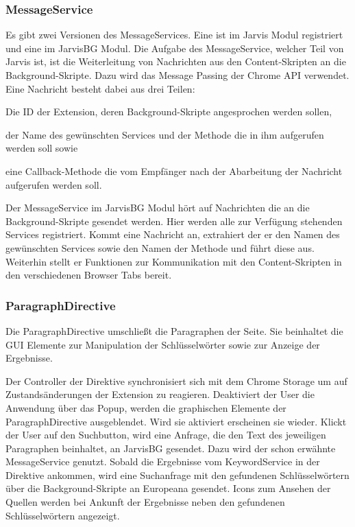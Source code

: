   \subsubsection{MessageService}
  Es gibt zwei Versionen des MessageServices. Eine ist im Jarvis Modul registriert und eine im JarvisBG Modul. Die Aufgabe des MessageService, welcher Teil von Jarvis ist, ist die Weiterleitung von Nachrichten aus den Content-Skripten an die Background-Skripte. Dazu wird das Message Passing der Chrome API verwendet. Eine Nachricht besteht dabei aus drei Teilen:
  \begin{enumerate*}
 	\item Die ID der Extension, deren Background-Skripte angesprochen werden sollen,
  	\item der Name des gewünschten Services und der Methode die in ihm aufgerufen werden soll sowie
 	\item eine Callback-Methode die vom Empfänger nach der Abarbeitung der Nachricht aufgerufen werden soll. 
  \end{enumerate*} 

  Der MessageService im JarvisBG Modul hört auf Nachrichten die an die Background-Skripte gesendet werden. Hier werden alle zur Verfügung stehenden Services registriert. Kommt eine Nachricht an, extrahiert der er den Namen des gewünschten Services sowie den Namen der Methode und führt diese aus. Weiterhin stellt er Funktionen zur Kommunikation mit den Content-Skripten in den verschiedenen Browser Tabs bereit.

  \subsubsection{ParagraphDirective}
  Die ParagraphDirective umschließt die Paragraphen der Seite. Sie beinhaltet die GUI Elemente zur Manipulation der Schlüsselwörter sowie zur Anzeige der Ergebnisse. 

  Der Controller der Direktive synchronisiert sich mit dem Chrome Storage um auf Zustandsänderungen der Extension zu reagieren. Deaktiviert der User die Anwendung über das Popup, werden die graphischen Elemente der ParagraphDirective ausgeblendet. Wird sie aktiviert erscheinen sie wieder. Klickt der User auf den Suchbutton, wird eine Anfrage, die den Text des jeweiligen Paragraphen beinhaltet, an JarvisBG gesendet. Dazu wird der schon erwähnte MessageService genutzt. Sobald die Ergebnisse vom KeywordService in der Direktive ankommen, wird eine Suchanfrage mit den gefundenen Schlüsselwörtern über die Background-Skripte an Europeana gesendet. Icons zum Ansehen der Quellen werden bei Ankunft der Ergebnisse neben den gefundenen Schlüsselwörtern angezeigt.

